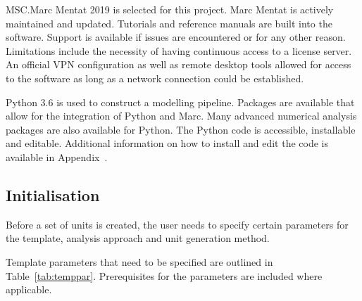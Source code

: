 MSC.Marc Mentat 2019 is selected for this project. Marc Mentat is actively maintained and updated. Tutorials and reference manuals are built into the software. Support is available if issues are encountered or for any other reason. Limitations include the necessity of having continuous access to a license server. An official VPN configuration as well as remote desktop tools allowed for access to the software as long as a network connection could be established.

Python 3.6 is used to construct a modelling pipeline. Packages are available that allow for the integration of Python and Marc. Many advanced numerical analysis packages are also available for Python. The Python code is accessible, installable and editable. Additional information on how to install and edit the code is available in Appendix~.

\subsection{Initialisation}
\label{ssec:init}

Before a set of units is created, the user needs to specify certain parameters for the template, analysis approach and unit generation method.

Template parameters that need to be specified are outlined in Table~\ref{tab:temppar}. Prerequisites for the parameters are included where applicable.

